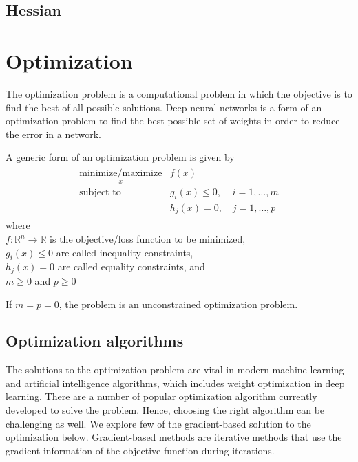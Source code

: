 \subsection{Hessian}
\section{Optimization}
The optimization problem is a computational problem in which the objective is to find the best of all possible solutions. Deep neural networks is a form of an optimization problem to find the best possible set of weights in order to reduce the error in a network.

\noindent A generic form of an optimization problem is given by 
\begin{align}
  \begin{matrix}
    \underset{x}{\text{minimize/maximize}} &f(x) & \\
    \text{subject to} &g_i(x) \leq 0, \, \, & i=1,\dots,m \\
    &h_j(x) = 0, & j=1,\dots,p
  \end{matrix}
  \label{eq:optimization_problem}
\end{align} 
\noindent where \\
\indent $f: \mathbb{R}^n \rightarrow \mathbb{R}$ is the objective/loss function to be minimized,\\
\indent $g_i(x) \leq 0$ are called inequality constraints,\\
\indent $h_j(x) = 0$ are called equality constraints, and \\
\indent $m\geq0$ and $p\geq0$

\vspace{5mm}
\noindent If $m=p=0$, the problem is an unconstrained optimization problem.
\subsection{Optimization algorithms}
The solutions to the optimization problem are vital in modern machine learning and artificial intelligence algorithms, which includes weight optimization in deep learning. There are a number of popular optimization algorithm currently developed to solve the problem. Hence, choosing the right algorithm can be challenging as well.
\vspace{5mm}
\noindent We explore few of the gradient-based solution to the optimization below. Gradient-based methods are iterative methods that use the gradient information of the objective function during iterations.

